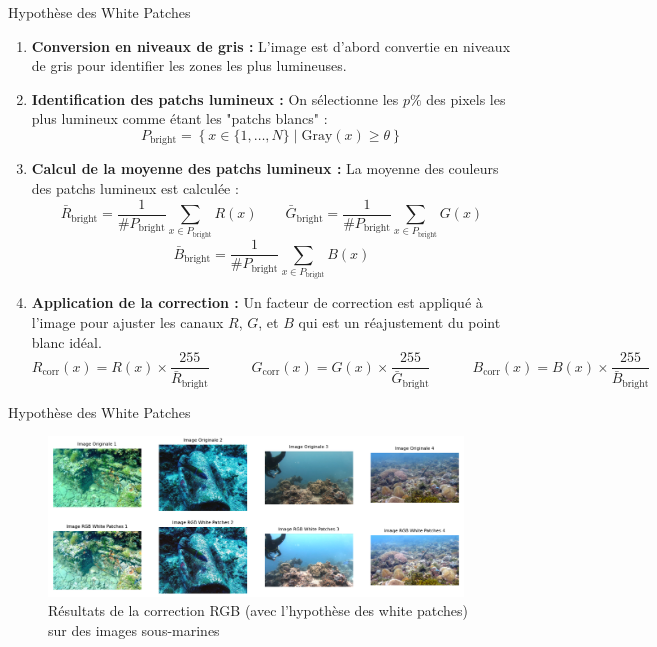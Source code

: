 \documentclass[8pt,a4paper]{beamer}
\numberwithin{figure}{section}
\begin{document}
\begin{frame}{Hypothèse des White Patches}
\begin{enumerate}
    \item \textbf{Conversion en niveaux de gris :} L'image est d'abord convertie en niveaux de gris pour identifier les zones les plus lumineuses.
    
    \item \textbf{Identification des patchs lumineux :} On sélectionne les \( p\% \) des pixels les plus lumineux comme étant les "patchs blancs" :
    \[
P_{\text{bright}} = \left\{ x \in \{1, \dots, N\} \mid \text{Gray}(x) \geq \theta \right\}
\]

    \item \textbf{Calcul de la moyenne des patchs lumineux :} La moyenne des couleurs des patchs lumineux est calculée :
\begingroup
\small   
    $$
    \bar{R}_{\text{bright}} = \frac{1}{\#P_{\text{bright}}} \!\sum_{x\in P_{\text{bright}}}\!\!\!\! R(x) \quad\quad \bar{G}_{\text{bright}} = \frac{1}{\#P_{\text{bright}}}\! \sum_{x\in P_{\text{bright}}} \!\!\!\!G(x) 
    $$
    $$
   \bar{B}_{\text{bright}} = \frac{1}{\#P_{\text{bright}}}\! \sum_{x\in P_{\text{bright}}} \!\!\!\! B(x)
    $$
\endgroup

    \item \textbf{Application de la correction :} Un facteur de correction est appliqué à l'image pour ajuster les canaux \( R \), \( G \), et \( B \) qui est un réajustement du point blanc idéal.
\begingroup
\small   
    $$
    R_{\text{corr}}(x) = R(x) \times \frac{255}{\bar{R}_{\text{bright}}} \quad\quad\quad G_{\text{corr}}(x) = G(x) \times \frac{255}{\bar{G}_{\text{bright}}} \quad\quad\quad B_{\text{corr}}(x) = B(x) \times \frac{255}{\bar{B}_{\text{bright}}}
    $$
\endgroup
\end{enumerate}
\end{frame}

\begin{frame}{Hypothèse des White Patches}
\begin{figure}[h!]
\begin{center}
\includegraphics[width=11cm]{image005.png}
\end{center}
\label{figure2.2}
\caption{Résultats de la correction RGB (avec l'hypothèse des white patches) sur des images sous-marines}
\end{figure}
\end{frame}
\end{document}
